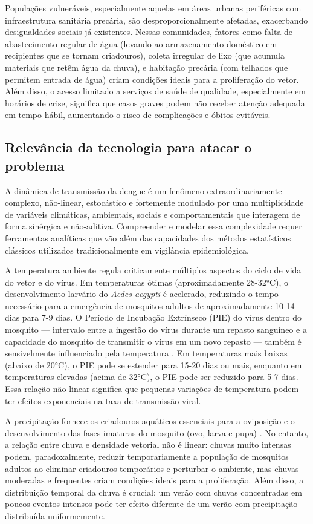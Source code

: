 Populações vulneráveis, especialmente aquelas em áreas urbanas periféricas com infraestrutura sanitária precária, são desproporcionalmente afetadas, exacerbando desigualdades sociais já existentes. Nessas comunidades, fatores como falta de abastecimento regular de água (levando ao armazenamento doméstico em recipientes que se tornam criadouros), coleta irregular de lixo (que acumula materiais que retêm água da chuva), e habitação precária (com telhados que permitem entrada de água) criam condições ideais para a proliferação do vetor. Além disso, o acesso limitado a serviços de saúde de qualidade, especialmente em horários de crise, significa que casos graves podem não receber atenção adequada em tempo hábil, aumentando o risco de complicações e óbitos evitáveis.

\subsection{Relevância da tecnologia para atacar o problema}

A dinâmica de transmissão da dengue é um fenômeno extraordinariamente complexo, não-linear, estocástico e fortemente modulado por uma multiplicidade de variáveis climáticas, ambientais, sociais e comportamentais que interagem de forma sinérgica e não-aditiva. Compreender e modelar essa complexidade requer ferramentas analíticas que vão além das capacidades dos métodos estatísticos clássicos utilizados tradicionalmente em vigilância epidemiológica.

A temperatura ambiente regula criticamente múltiplos aspectos do ciclo de vida do vetor e do vírus. Em temperaturas ótimas (aproximadamente 28-32°C), o desenvolvimento larvário do \textit{Aedes aegypti} é acelerado, reduzindo o tempo necessário para a emergência de mosquitos adultos de aproximadamente 10-14 dias para 7-9 dias. O Período de Incubação Extrínseco (PIE) do vírus dentro do mosquito — intervalo entre a ingestão do vírus durante um repasto sanguíneo e a capacidade do mosquito de transmitir o vírus em um novo repasto — também é sensivelmente influenciado pela temperatura \cite{fan2015systematic, li2020effects, briere1999novel}. Em temperaturas mais baixas (abaixo de 20°C), o PIE pode se estender para 15-20 dias ou mais, enquanto em temperaturas elevadas (acima de 32°C), o PIE pode ser reduzido para 5-7 dias. Essa relação não-linear significa que pequenas variações de temperatura podem ter efeitos exponenciais na taxa de transmissão viral.

A precipitação fornece os criadouros aquáticos essenciais para a oviposição e o desenvolvimento das fases imaturas do mosquito (ovo, larva e pupa) \cite{li2020effects}. No entanto, a relação entre chuva e densidade vetorial não é linear: chuvas muito intensas podem, paradoxalmente, reduzir temporariamente a população de mosquitos adultos ao eliminar criadouros temporários e perturbar o ambiente, mas chuvas moderadas e frequentes criam condições ideais para a proliferação. Além disso, a distribuição temporal da chuva é crucial: um verão com chuvas concentradas em poucos eventos intensos pode ter efeito diferente de um verão com precipitação distribuída uniformemente.

